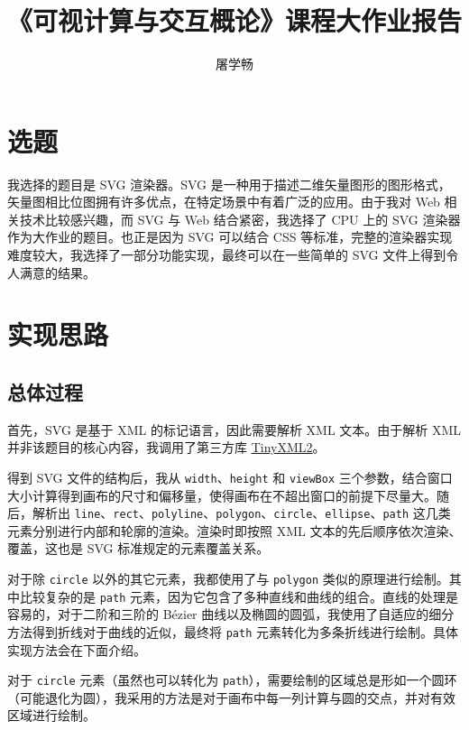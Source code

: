 \documentclass[UTF8]{ctexart}
\title{《可视计算与交互概论》课程大作业报告}
\author{屠学畅}
\date{}
\begin{document}
\maketitle

\thispagestyle{empty}

\section{选题}

我选择的题目是 SVG 渲染器。SVG 是一种用于描述二维矢量图形的图形格式，矢量图相比位图拥有许多优点，在特定场景中有着广泛的应用。由于我对 Web 相关技术比较感兴趣，而 SVG 与 Web 结合紧密，我选择了 CPU 上的 SVG 渲染器作为大作业的题目。也正是因为 SVG 可以结合 CSS 等标准，完整的渲染器实现难度较大，我选择了一部分功能实现，最终可以在一些简单的 SVG 文件上得到令人满意的结果。

\section{实现思路}

\subsection{总体过程}

首先，SVG 是基于 XML 的标记语言，因此需要解析 XML 文本。由于解析 XML 并非该题目的核心内容，我调用了第三方库 \href{https://github.com/leethomason/tinyxml2}{TinyXML2}。

得到 SVG 文件的结构后，我从 \texttt{width}、\texttt{height} 和 \texttt{viewBox} 三个参数，结合窗口大小计算得到画布的尺寸和偏移量，使得画布在不超出窗口的前提下尽量大。随后，解析出 \texttt{line}、\texttt{rect}、\texttt{polyline}、\texttt{polygon}、\texttt{circle}、\texttt{ellipse}、\texttt{path} 这几类元素分别进行内部和轮廓的渲染。渲染时即按照 XML 文本的先后顺序依次渲染、覆盖，这也是 SVG 标准规定的元素覆盖关系。

对于除 \texttt{circle} 以外的其它元素，我都使用了与 \texttt{polygon} 类似的原理进行绘制。其中比较复杂的是 \texttt{path} 元素，因为它包含了多种直线和曲线的组合。直线的处理是容易的，对于二阶和三阶的 Bézier 曲线以及椭圆的圆弧，我使用了自适应的细分方法得到折线对于曲线的近似，最终将 \texttt{path} 元素转化为多条折线进行绘制。具体实现方法会在下面介绍。

对于 \texttt{circle} 元素（虽然也可以转化为 \texttt{path}），需要绘制的区域总是形如一个圆环（可能退化为圆），我采用的方法是对于画布中每一列计算与圆的交点，并对有效区域进行绘制。
\end{document}
